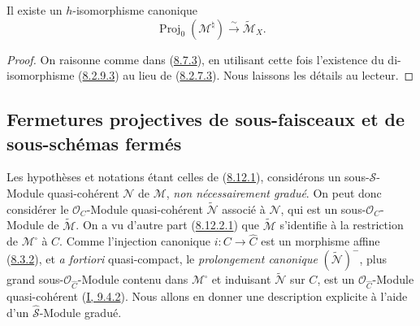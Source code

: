 \begin{proposition}[8.12.10]
\label{II.8.12.10-fr}
Il existe un $h$-isomorphisme canonique
\begin{equation}
\label{II.8.12.10.1-fr}
  \operatorname{Proj}_0(\mathcal{M}^{\natural})
  \xrightarrow{\sim}\widetilde{\mathcal{M}}_X.
\tag{8.12.10.1}
\end{equation}
\end{proposition}

\begin{proof}
On raisonne comme dans (\hyperref[II.8.7.3-fr]{8.7.3}), en utilisant cette
fois l'existence du di-isomorphisme (\hyperref[II.8.2.9.3-fr]{8.2.9.3}) au
lieu de (\hyperref[II.8.2.7.3-fr]{8.2.7.3}). Nous laissons les détails au
lecteur.
\end{proof}

\subsection{Fermetures projectives de sous-faisceaux et de sous-schémas
fermés}
\label{subsection:II.8.13-fr}

\begin{env}[8.13.1]
\label{II.8.13.1-fr}
Les hypothèses et notations étant celles de
(\hyperref[II.8.12.1-fr]{8.12.1}), considérons un sous-$\mathcal{S}$-Module
quasi-cohérent $\mathcal{N}$ de $\mathcal{M}$, \emph{non nécessairement
gradué}. On peut donc considérer le $\mathcal{O}_C$-Module quasi-cohérent
$\widetilde{\mathcal{N}}$ associé à $\mathcal{N}$, qui est un
sous-$\mathcal{O}_C$-Module de $\widetilde{\mathcal{M}}$. On a vu d'autre
part (\hyperref[II.8.12.2.1-fr]{8.12.2.1}) que
$\widetilde{\mathcal{M}}$ s'identifie à la restriction de
$\mathcal{M}^{\square}$ à $C$. Comme l'injection canonique
$i:C\to\widehat{C}$ est un morphisme affine
(\hyperref[II.8.3.2-fr]{8.3.2}), et \emph{a fortiori} quasi-compact, le
\emph{prolongement canonique} $(\widetilde{\mathcal{N}})^{-}$, plus grand
sous-$\mathcal{O}_{\widehat{C}}$-Module contenu dans
$\mathcal{M}^{\square}$ et induisant $\widetilde{\mathcal{N}}$ sur $C$, est
un $\mathcal{O}_{\widehat{C}}$-Module quasi-cohérent
(\hyperref[I.9.4.2-fr]{I, 9.4.2}). Nous allons en donner une description
explicite à l'aide d'un $\widehat{\mathcal{S}}$-Module gradué.
\end{env}

